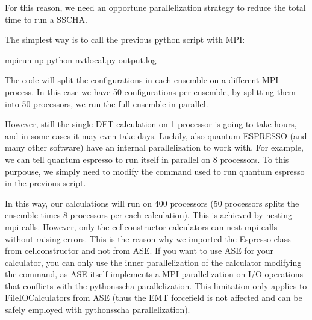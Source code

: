 \documentclass[a4paper,11pt,english]{sphinxmanual}
\begin{document}
\sphinxAtStartPar
For this reason, we need an opportune parallelization strategy to reduce the total time to run a SSCHA.

\sphinxAtStartPar
The simplest way is to call the previous python script with MPI:

\begin{sphinxVerbatim}[commandchars=\\\{\}]
\PYGZdl{} mpirun \PYGZhy{}np  python nvt\PYGZus{}local.py \PYGZgt{} output.log
\end{sphinxVerbatim}

\sphinxAtStartPar
The code will split the configurations in each ensemble on a different MPI process. In this case we have 50 configurations per ensemble, by splitting them into 50 processors, we run the full ensemble in parallel.

\sphinxAtStartPar
However, still the single DFT calculation on 1 processor is going to take hours, and in some cases it may even take days.
Luckily, also quantum ESPRESSO (and many other software) have an internal parallelization to work with.
For example, we can tell quantum espresso to run itself in parallel on 8 processors.
To this purpouse, we simply need to modify the command used to run quantum espresso in the previous script.

\begin{sphinxVerbatim}[commandchars=\\\{\}]
  

  
                                       
                                       
                                       
\end{sphinxVerbatim}

\sphinxAtStartPar
In this way, our calculations will run on 400 processors (50 processors splits the ensemble times 8 processors per each calculation).
This is achieved by nesting mpi calls. However, only the cellconstructor calculators can nest mpi calls without raising errors. This is the reason why we imported the Espresso class from cellconstructor and not from ASE.
If you want to use ASE for your calculator, you can only use the inner parallelization of the calculator modifying the command, as ASE itself implements a MPI parallelization on I/O operations that conflicts with the python\sphinxhyphen{}sscha parallelization. This limitation only applies to FileIOCalculators from ASE (thus the EMT force\sphinxhyphen{}field is not affected and can be safely employed with python\sphinxhyphen{}sscha parallelization).
\end{document}
